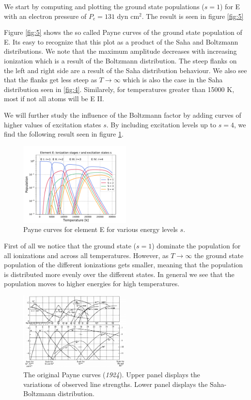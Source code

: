 \documentclass[a4paper,11.5pt,]{article}
\begin{document}
\begin{multicols}{2}
We start by computing and plotting the ground state populations ($s=1$) for E with an electron pressure of $P_e = 131$ dyn cm$^2$. The result is seen in figure \ref{fig:5}

\noindent Figure \ref{fig:5} shows the so called Payne curves of the ground state population of E. Its easy to recognize that this plot as a product of the Saha and Boltzmann distributions. We note that the maximum amplitude decreases with increasing ionization which is a result of the Boltzmann distribution. The steep flanks on the left and right side are a result of the Saha distribution behaviour. We also see that the flanks get less steep as $T \rightarrow \infty$ which is also the case in the Saha distribution seen in \ref{fig:4}. Similarely, for temperatures greater than 15000 K, most if not all atoms will be E II.

We will further study the influence of the Boltzmann factor by adding curves of higher values of excitation states $s$. By including excitation levels up to $s=4$, we find the following result seen in figure \ref{fig:6}. 


\begin{figure}[H]
	\centering
	\includegraphics[width=0.5\textwidth]{figures/payne_E_multi.pdf}
	\caption{Payne curves for element E for various energy levels $s$. }
	\label{fig:6}
\end{figure}

\noindent First of all we notice that the ground state ($s=1$) dominate the population for all ionizations and across all temperatures. However, as $T \rightarrow \infty$ the ground state population of the different ionizations gets smaller, meaning that the population is distributed more evenly over the different states. In general we see that the population moves to higher energies for high temperatures.

\begin{figure}[H]
	\centering
	\includegraphics[width=0.5\textwidth]{SSA/figures/Payne.png}
	\caption{The original Payne curves (\textit{1924}). Upper panel displays the variations of observed line strengths. Lower panel displays the Saha-Boltzmann distribution.}
	\label{fig:7}
\end{figure}


\end{multicols}
\end{document}
